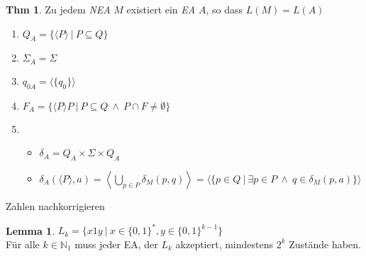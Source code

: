 \documentclass[a4paper, 10pt]{article}
\theoremstyle{definition}
\newtheorem{lemma}{Lemma}[section]
\newtheorem{theorem}{Thm}[section]
\newcommand{\N}{\mathbb{N}}
\newcommand{\A}{\Sigma}
\begin{document}
\begin{theorem}
    Zu jedem \textit{NEA} \(M\) existiert ein \textit{EA} \(A\), so dass \(L(M) = L(A)\)
    \begin{enumerate}
        \item \(Q_A = \{\langle P \rangle \ | \ P \subseteq Q\}\)
        \item \(\A_A = \A\)
        \item \(q_{0A} = \langle \{q_0\} \rangle\)
        \item \(F_A = \{\langle P \rangle P \ | \ P \subseteq Q \ \land \ P \cap F \neq \emptyset\}\)
        \item \begin{itemize}
            \item \(\delta_A = Q_A \times \A \times Q_A\)
            \item \(\delta_A(\langle P \rangle, a) = \left\langle \bigcup_{p \in P} \delta_M(p, q) \right\rangle = \langle\{p \in Q \ | \ \exists p \in P \ \land \ q \in \delta_M(p, a)\}\rangle\)
        \end{itemize}
    \end{enumerate}
\end{theorem}

Zahlen nachkorrigieren
\begin{lemma}
    \(L_k = \{x1y \ | \ x \in \{0, 1\}^*, y \in \{0, 1\}^{k - 1}\}\) \\
    Für alle \(k \in \N_1\) muss jeder EA, der \(L_k\) akzeptiert, mindestens \(2^k\) Zustände haben.
\end{lemma}
\end{document}
